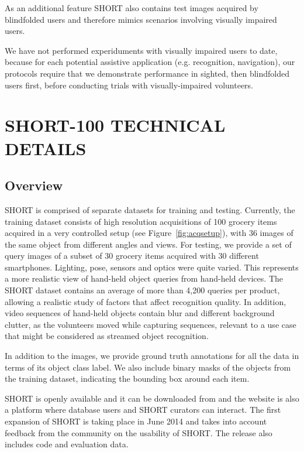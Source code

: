 As an additional feature SHORT also contains test images acquired by blindfolded users and therefore mimics scenarios involving visually impaired users. 

We have not performed experiduments with visually impaired users to date, because for each potential assistive application (e.g. recognition, navigation), our protocols require that we demonstrate performance in sighted, then blindfolded users first, before conducting trials with visually-impaired volunteers. 

\section{SHORT-100 TECHNICAL DETAILS} \label{sec:short}

\subsection{Overview}

SHORT is comprised of separate datasets for training and testing. Currently, the training dataset consists of high resolution acquisitions of 100 grocery items acquired in a very controlled setup (see Figure~\ref{fig:acqsetup}), with 36 images of the same object from different angles and views. For testing, we provide a set of query images of a subset of 30 grocery items acquired with 30 different smartphones. Lighting, pose, sensors and optics were quite varied. This represents a more realistic view of hand-held object queries from hand-held devices. The SHORT dataset contains an average of more than 4,200 queries per product, allowing a realistic study of factors that affect recognition quality. In addition, video sequences of hand-held objects contain blur and different background clutter, as the volunteers moved while capturing sequences, relevant to a use case that might be considered as streamed object recognition. 



In addition to the images, we provide ground truth annotations for all the data in terms of its object class label. We also include binary masks of the objects from the training dataset, indicating the bounding box around each item.

SHORT is openly available and it can be downloaded from \cite{Rivera-Rubio} and the website is also a platform where database users and SHORT curators can interact. The first expansion of SHORT is taking place in June 2014 and takes into account feedback from the community on the usability of SHORT. The release also includes code and evaluation data.

